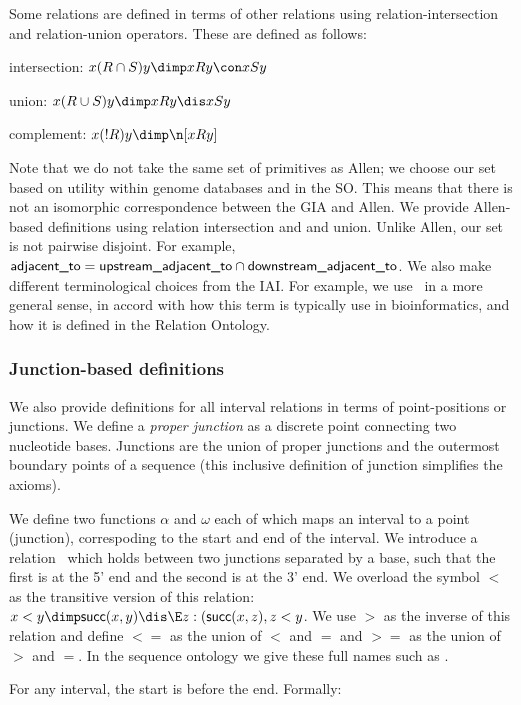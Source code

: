 \documentclass{article}
\def\succ{\pr{succ}}
\def\upstreamOfJ{\pr{before}}
\def\adjacentTo{\pr{adjacent\_to}}
\def\upstreamAdjacentTo{\pr{upstream\_adjacent\_to}}
\def\downstreamAdjacentTo{\pr{downstream\_adjacent\_to}}
\def\overlaps{\pr{overlaps}}
\begin{document}
Some relations are defined in terms of other relations using
relation-intersection and relation-union operators. These are defined as follows:

intersection: $ x (R \cap S) y \dimp x R y \con x S y$

union: $ x (R \cup S) y \dimp x R y \dis x S y$

complement: $ x (!R) y \dimp \n [ x R y ]$

Note that we do not take the same set of primitives as Allen; we
choose our set based on utility within genome databases and in the
SO. This means that there is not an isomorphic correspondence between
the GIA and Allen. We provide Allen-based definitions using relation
intersection and and union. Unlike Allen, our set is not pairwise
disjoint. For example, $\adjacentTo = \upstreamAdjacentTo \cap
\downstreamAdjacentTo$. We also make different terminological choices
from the IAI. For example, we use \overlaps\ in a more general sense,
in accord with how this term is typically use in bioinformatics, and
how it is defined in the Relation Ontology.

\subsubsection{Junction-based definitions}

We also provide definitions for all interval relations in terms of
point-positions or junctions. We define a \emph{proper junction} as a
discrete point connecting two nucleotide bases. Junctions are the union
of proper junctions and the outermost boundary points of a sequence
(this inclusive definition of junction simplifies the axioms).

We define two functions $\alpha$ and $\omega$ each of which maps an
interval to a point (junction), correspoding to the start and end of
the interval. We introduce a relation \succ\ which holds between two
junctions separated by a base, such that the first is at the 5' end
and the second is at the 3' end. We overload the symbol $<$ as the
transitive version of this relation: $x<y \dimp \succ(x,y) \dis \E z:
(\succ(x,z),z<y$. We use $>$ as the inverse of this relation and
define $<=$ as the union of $<$ and $=$ and $>=$ as the union of $>$
and $=$. In the sequence ontology we give these full names such as
\upstreamOfJ.

For any interval, the start is before the end. Formally:
\end{document}
